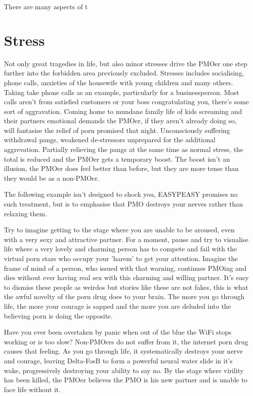 \documentclass[easypeasy.tex]{subfiles}
\begin{document}
There are many aspects of t

\section{Stress}

Not only great tragedies in life, but also minor stresses drive the PMOer one step further into the forbidden area previously excluded. Stresses includes socialising, phone calls, anxieties of the housewife with young children and many others. Taking take phone calls as an example, particularly for a businessperson. Most calls aren't from satisfied customers or your boss congratulating you, there's some sort of aggravation. Coming home to mundane family life of kids screaming and their partners emotional demands the PMOer, if they aren't already doing so, will fantasise the relief of porn promised that night. Unconsciously suffering withdrawal pangs, weakened de-stressors unprepared for the additional aggrevation. Partially relieving the pangs at the same time as normal stress, the total is reduced and the PMOer gets a temporary boost. The boost isn't an illusion, the PMOer does feel better than before, but they are more tense than they would be as a non-PMOer.

The following example isn't designed to shock you, EASYPEASY promises no such treatment, but is to emphasise that PMO destroys your nerves rather than relaxing them.

Try to imagine getting to the stage where you are unable to be aroused, even with a very sexy and attractive partner. For a moment, pause and try to visualise life where a very lovely and charming person has to compete and fail with the virtual porn stars who occupy your 'harem' to get your attention. Imagine the frame of mind of a person, who issued with that warning, continues PMOing and dies without ever having real sex with this charming and willing partner. It's easy to dismiss these people as weirdos but stories like these are not fakes, this is what the awful novelty of the porn drug does to your brain. The more you go through life, the more your courage is sapped and the more you are deluded into the believing porn is doing the opposite.

Have you ever been overtaken by panic when out of the blue the WiFi stops working or is too slow? Non-PMOers do not suffer from it, the internet porn drug causes that feeling. As you go through life, it systematically destroys your nerve and courage, leaving Delta-FosB to form a powerful neural water slide in it's wake, progressively destroying your ability to say no. By the stage where virility has been killed, the PMOer believes the PMO is his new partner and is unable to face life without it.
\end{document}
